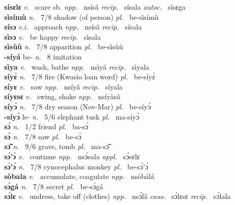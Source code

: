 {\bfseries sísɛlɛ}  {\itshape v.~} scare sb.  {\itshape npp.~} nsísâ  {\itshape recip.~} sísala {\itshape autoc.~} sísɛga  \\ 
{\bfseries sìsímù}  {\itshape n.~} 7/8 shadow (of  person) {\itshape pl.~} be-sìsímù    \\ 
{\bfseries sísɔ}  {\itshape v.i.~} approach {\itshape npp.~} nsísâ {\itshape recip.~} sísala  \\ 
{\bfseries sìsɔ}  {\itshape v.~} be happy   {\itshape recip.~} sìsala  \\ 
{\bfseries sìsùù}  {\itshape n.~} 7/8 apparition {\itshape pl.~} be-sìsùù    \\ 
{\bfseries -síyá} be- {\itshape n.~} 8 imitation    \\ 
{\bfseries sìya}  {\itshape v.~} wash, bathe   {\itshape npp.~} nsìyá {\itshape recip.~} sìyala  \\ 
{\bfseries síyɛ̀}  {\itshape n.~} 7/8 fire (Kwasio loan word) {\itshape pl.~} be-síyɛ̀    \\ 
{\bfseries síyɛ}  {\itshape v.~} saw   {\itshape npp.~} nsíyâ {\itshape recip.~} síyala  \\ 
{\bfseries síyɛsɛ}  {\itshape v.~} swing, shake   {\itshape npp.~} nsíyàsâ  \\ 
{\bfseries síyɔ̀}  {\itshape n.~} 7/8 dry season (Nov-Mar) {\itshape pl.~} be-síyɔ̀    \\ 
{\bfseries -síyɔ̀} le- {\itshape n.~} 5/6 elephant tusk {\itshape pl.~} ma-síyɔ̀    \\ 
{\bfseries sɔ́}  {\itshape n.~} 1/2 friend {\itshape pl.~} ba-sɔ́    \\ 
{\bfseries sɔ̀}  {\itshape n.~} 7/8 saw {\itshape pl.~} be-sɔ̀    \\ 
{\bfseries sɔ̃̂}  {\itshape n.~} 9/6 grave, tomb {\itshape pl.~} ma-sɔ̃̂    \\ 
{\bfseries sɔ́'ɔ̀}  {\itshape v.~} continue   {\itshape npp.~} nsɔ́sala {\itshape appl.~} sɔ́sɛlɛ   \\ 
{\bfseries sɔ̀'ɔ́}  {\itshape n.~} 7/8 cynocephalus monkey {\itshape pl.~} be-sɔ̀'ɔ́    \\ 
{\bfseries sòbala}  {\itshape v.~} accumulate, coagulate   {\itshape npp.~} nsòbálá  \\ 
{\bfseries sɔ̀gá}  {\itshape n.~} 7/8 secret {\itshape pl.~} be-sɔ̀gá    \\ 
{\bfseries sɔ́lɛ}  {\itshape v.~} undress, take off (clothes)   {\itshape npp.~} nsɔ́lâ {\itshape caus.~} sɔ́lɛsɛ {\itshape recip.~} sɔ́lala  \\ 
